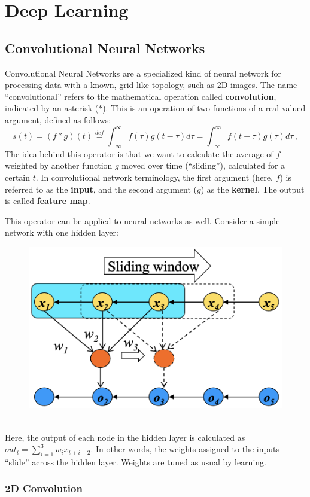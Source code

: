 \chapter{Deep Learning}

\section{Convolutional Neural Networks}

Convolutional Neural Networks are a specialized kind of neural network for processing data with a known, grid-like topology, such as 2D images. The name ``convolutional'' refers to the mathematical operation called \textbf{convolution}, indicated by an asterisk ($*$). This is an operation of two functions of a real valued argument, defined as follows:
\begin{equation*}
    s(t) = (f * g)(t) \stackrel{def}{=} \int_{-\infty}^{\infty} f(\tau)g(t - \tau) d \tau = \int_{-\infty}^{\infty} f(t - \tau)g(\tau) d\tau \,,
\end{equation*}
The idea behind this operator is that we want to calculate the average of $f$ weighted by another function $g$ moved over time (``sliding''), calculated for a certain $t$. In convolutional network terminology, the first argument (here, $f$) is referred to as the \textbf{input}, and the second argument ($g$) as the \textbf{kernel}. The output is called \textbf{feature map}.

This operator can be applied to neural networks as well. Consider a simple network with one hidden layer:
\begin{figure}[h]
    \centering
    \includegraphics[width=0.45\linewidth]{img/CNN_simple.png}
\end{figure} \\
Here, the output of each node in the hidden layer is calculated as $out_t = \sum_{i=1}^3 w_i x_{t+i-2}$. In other words, the weights assigned to the inputs ``slide'' across the hidden layer. Weights are tuned as usual by learning.

\subsection{2D Convolution}


